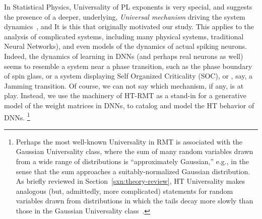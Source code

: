 {{In Statistical Physics, Universality of PL exponents is very special, and suggests the presence of a deeper, underlying, \emph{Universal mechanism}
 driving the system dynamics~\cite{SornetteBook,BouchaudPotters03}, and It  is this     that originally motivated our study.  
 This applies to the analysis of complicated systems, including many physical systems,  traditional Neural Networks\cite{EB01_BOOK,nishimori01}),
and even models of the dynamics of actual spiking neurons.
Indeed, the dynamics of learning in DNNs (and perhaps real neurons as well) seems to resemble a system near a phase transition,
such as the phase boundary of spin glass, or a system displaying Self Organized Criticality (SOC), or , say, a Jamming transition.  
Of course, we can not say which mechanism, if any, is at play.  Instead, we use the machinery of  HT-RMT 
as a stand-in for a generative model of the weight matrices in DNNs, to catalog and model the  HT behavior of DNNs.
\footnote{Perhaps the most well-known Universality in RMT is associated with the Gaussian Universality class, where the sum of many random variables drawn from a wide range of distributions is ``approximately Gaussian,'' e.g., in the sense that the sum approaches a suitably-normalized Gaussian distribution.  As briefly reviewed in Section~\ref{sxn:theory-review}, HT Universality makes analogous (but, admittedly, more complicated) statements for random variables drawn from distributions in which the tails decay more slowly than those in the Gaussian Universality class~\cite{MM18_TR}.}
}



}
